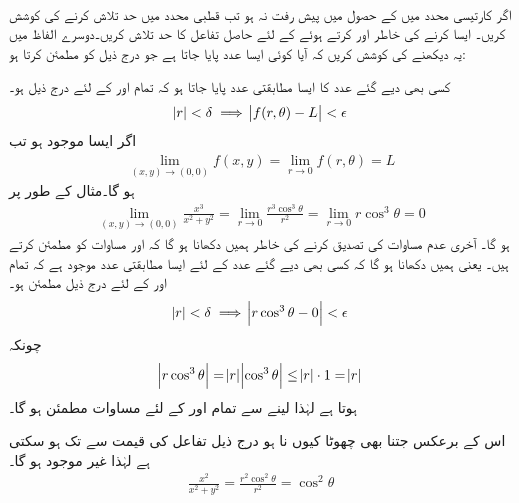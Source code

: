 \\
اگر کارتیسی محدد میں   کے حصول میں پیش رفت  نہ ہو تب قطبی محدد میں حد تلاش کرنے کی کوشش کریں۔ ایسا کرنے  کی خاطر  اور  کرتے ہوئے   کے لئے حاصل تفاعل کا حد تلاش کریں۔دوسرے الفاظ میں یہ دیکھنے کی کوشش کریں کہ آیا کوئی ایسا عدد  پایا جاتا ہے جو درج ذیل کو مطمئن کرتا ہو:

کسی بھی دیے گئے عدد  کا ایسا مطابقتی عدد  پایا جاتا ہو کہ تمام  اور  کے لئے درج ذیل ہو۔
\begin{align*}
\abs{r}<\delta\implies \abs{f(r,\theta)-L}<\epsilon
\end{align*}
اگر ایسا  موجود ہو تب
\begin{align}\label{مساوات_کثیرالمتغیر_قطبی_حد_الف}
\lim_{(x,y)\to(0,0)}f(x,y)=\lim_{r\to 0}f(r,\theta)=L
\end{align}
ہو گا۔مثال کے طور پر 
\begin{align*}
\lim_{(x,y)\to(0,0)}\frac{x^3}{x^2+y^2}=\lim_{r\to 0}\frac{r^3\cos^3\theta}{r^2}=\lim_{r\to 0}r\cos^3\theta=0
\end{align*}
ہو گا۔ آخری عدم مساوات  کی تصدیق کرنے کی خاطر ہمیں دکھانا  ہو گا کہ  اور   مساوات  کو مطمئن کرتے ہیں۔ یعنی ہمیں دکھانا ہو گا کہ کسی بھی دیے گئے عدد  کے لئے ایسا مطابقتی  عدد  موجود ہے کہ  تمام  اور  کے لئے درج ذیل  مطمئن ہو۔
\begin{align}\label{مساوات_کثیرالمتغیر_قطبی_حد_ب}
\abs{r}<\delta\implies \abs{r\cos^3\theta-0}<\epsilon
\end{align}
چونکہ
\begin{align*}
\abs{r\cos^3\theta}=\abs{r}\abs{\cos^3\theta}\le \abs{r}\cdot 1=\abs{r}
\end{align*}
ہوتا ہے لہٰذا   لینے سے تمام  اور  کے لئے مساوات  مطمئن ہو گا۔

اس کے برعکس     جتنا بھی چھوٹا کیوں نا ہو   درج ذیل تفاعل کی قیمت   سے   تک ہو سکتی ہے لہٰذا  غیر موجود ہو گا۔
\begin{align*}
\frac{x^2}{x^2+y^2}=\frac{r^2\cos^2\theta}{r^2}=\cos^2\theta
\end{align*}

